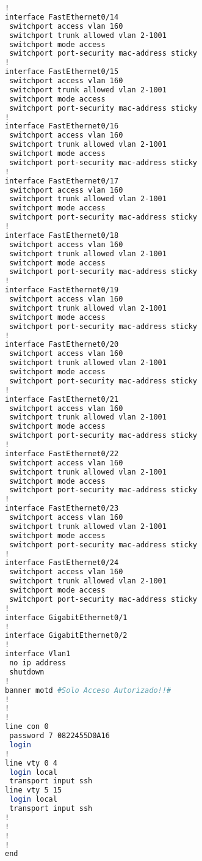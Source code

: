 \begin{lstlisting}[language=Bash, caption={Configuración Completa Switch DMZ IoMT}]
!
interface FastEthernet0/14
 switchport access vlan 160
 switchport trunk allowed vlan 2-1001
 switchport mode access
 switchport port-security mac-address sticky 
!
interface FastEthernet0/15
 switchport access vlan 160
 switchport trunk allowed vlan 2-1001
 switchport mode access
 switchport port-security mac-address sticky 
!
interface FastEthernet0/16
 switchport access vlan 160
 switchport trunk allowed vlan 2-1001
 switchport mode access
 switchport port-security mac-address sticky 
!
interface FastEthernet0/17
 switchport access vlan 160
 switchport trunk allowed vlan 2-1001
 switchport mode access
 switchport port-security mac-address sticky 
!
interface FastEthernet0/18
 switchport access vlan 160
 switchport trunk allowed vlan 2-1001
 switchport mode access
 switchport port-security mac-address sticky 
!
interface FastEthernet0/19
 switchport access vlan 160
 switchport trunk allowed vlan 2-1001
 switchport mode access
 switchport port-security mac-address sticky 
!
interface FastEthernet0/20
 switchport access vlan 160
 switchport trunk allowed vlan 2-1001
 switchport mode access
 switchport port-security mac-address sticky 
!
interface FastEthernet0/21
 switchport access vlan 160
 switchport trunk allowed vlan 2-1001
 switchport mode access
 switchport port-security mac-address sticky 
!
interface FastEthernet0/22
 switchport access vlan 160
 switchport trunk allowed vlan 2-1001
 switchport mode access
 switchport port-security mac-address sticky 
!
interface FastEthernet0/23
 switchport access vlan 160
 switchport trunk allowed vlan 2-1001
 switchport mode access
 switchport port-security mac-address sticky 
!
interface FastEthernet0/24
 switchport access vlan 160
 switchport trunk allowed vlan 2-1001
 switchport mode access
 switchport port-security mac-address sticky 
!
interface GigabitEthernet0/1
!
interface GigabitEthernet0/2
!
interface Vlan1
 no ip address
 shutdown
!
banner motd #Solo Acceso Autorizado!!#
!
!
!
line con 0
 password 7 0822455D0A16
 login
!
line vty 0 4
 login local
 transport input ssh
line vty 5 15
 login local
 transport input ssh
!
!
!
!
end
\end{lstlisting}
